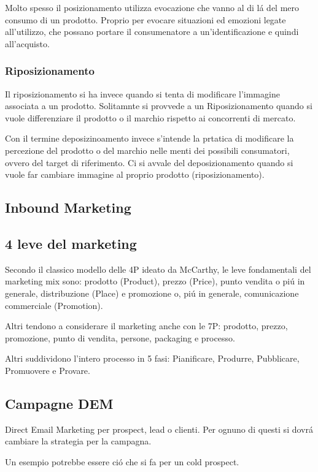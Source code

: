 \documentclass{article}
\begin{document}
Molto spesso il posizionamento utilizza evocazione che vanno al di l\'a del mero consumo di un prodotto. Proprio per evocare situazioni ed emozioni legate all'utilizzo, che possano portare il consumenatore a un'identificazione e quindi all'acquisto.

\subsubsection{Riposizionamento}
Il riposizionamento si ha invece quando si tenta di modificare l'immagine associata a un prodotto. Solitamnte si provvede a un Riposizionamento quando si vuole differenziare il prodotto o il marchio rispetto ai concorrenti di mercato.

Con il termine deposizinoamento invece s'intende la prtatica di modificare la percezione del prodotto o del marchio nelle menti dei possibili consumatori, ovvero del target di riferimento. Ci si avvale del deposizionamento quando si vuole far cambiare immagine al proprio prodotto (riposizionamento).

\subsection{Inbound Marketing}

\subsection{4 leve del marketing}
Secondo il classico modello delle 4P ideato da McCarthy, le leve fondamentali del marketing mix sono: prodotto (Product), prezzo (Price), punto vendita o pi\'u in generale, distribuzione (Place) e promozione o, pi\'u in generale, comunicazione commerciale (Promotion).

Altri tendono a considerare il marketing anche con le 7P: prodotto, prezzo, promozione, punto di vendita, persone, packaging e processo.

Altri suddividono l'intero processo in 5 fasi: Pianificare, Produrre, Pubblicare, Promuovere e Provare.

\subsection{Campagne DEM}
Direct Email Marketing per prospect, lead o clienti.  Per ognuno di questi si dovr\'a cambiare la strategia per la campagna. 

Un esempio potrebbe essere ci\'o che si fa per un cold prospect. 
\end{document}
